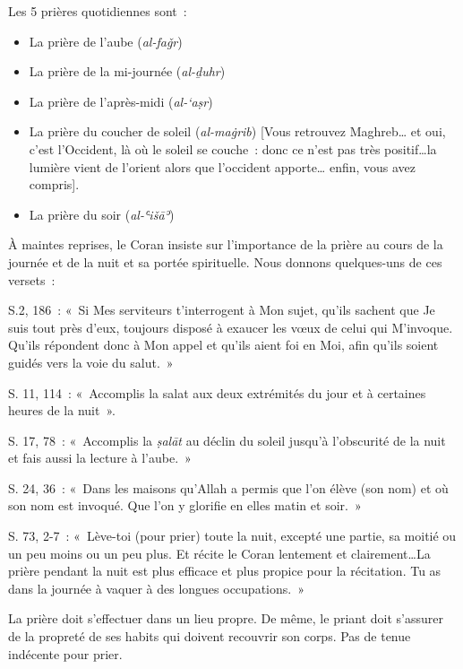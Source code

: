 Les 5 prières quotidiennes sont~:

\begin{itemize}
\item
  La prière de l'aube (\emph{al-faǧr})
\item
  La prière de la mi-journée (\emph{al-ḏuhr})
\item
  La prière de l'après-midi (\emph{al-`aṣr})
\item
  La prière du coucher de soleil (\emph{al-maġrib}) {[}Vous retrouvez
  Maghreb\ldots{} et oui, c'est l'Occident, là où le soleil se couche~:
  donc ce n'est pas très positif\ldots la lumière vient de l'orient
  alors que l'occident apporte\ldots{} enfin, vous avez compris{]}.
\item
  La prière du soir (\emph{al-ʿišāʾ})
\end{itemize}

À maintes reprises, le Coran insiste sur l'importance de la prière au
cours de la journée et de la nuit et sa portée spirituelle. Nous donnons
quelques-uns de ces versets~:

S.2, 186~: «~Si Mes serviteurs t'interrogent à Mon sujet, qu'ils sachent
que Je suis tout près d'eux, toujours disposé à exaucer les vœux de
celui qui M'invoque. Qu'ils répondent donc à Mon appel et qu'ils aient
foi en Moi, afin qu'ils soient guidés vers la voie du salut.~»

S. 11, 114~: «~Accomplis la salat aux deux extrémités du jour et à
certaines heures de la nuit~».

S. 17, 78~: «~Accomplis la \emph{ṣalāt} au déclin du soleil jusqu'à
l'obscurité de la nuit et fais aussi la lecture à l'aube.~»

S. 24, 36~: «~Dans les maisons qu'Allah a permis que l'on élève (son
nom) et où son nom est invoqué. Que l'on y glorifie en elles matin et
soir.~»

S. 73, 2-7~: «~Lève-toi (pour prier) toute la nuit, excepté une partie,
sa moitié ou un peu moins ou un peu plus. Et récite le Coran lentement
et clairement\ldots La prière pendant la nuit est plus efficace et plus
propice pour la récitation. Tu as dans la journée à vaquer à des longues
occupations.~»


La prière doit s'effectuer dans un lieu propre. De même, le priant doit
s'assurer de la propreté de ses habits qui doivent recouvrir son corps.
Pas de tenue indécente pour prier.

